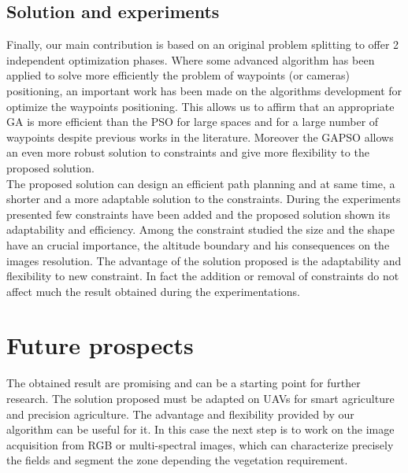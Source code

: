 \subsection{Solution and experiments }
Finally,  our main contribution is based on an original problem splitting to offer 2 independent optimization phases. Where some advanced algorithm has been applied to solve more efficiently the problem of waypoints (or cameras) positioning, an important work has been made on the algorithms development for optimize the waypoints positioning. This allows us to affirm that an appropriate GA is more efficient than the PSO for large spaces and for a large number of waypoints despite previous works in the literature. Moreover the GAPSO allows an even more robust solution to constraints and give more flexibility to the proposed solution. \\
The proposed solution can design an efficient path planning and at same time, a shorter and a more adaptable solution to the constraints. During the experiments presented few constraints have been added and the proposed solution shown its adaptability and efficiency. Among the constraint studied  the size and the shape have an crucial importance, the  altitude boundary and his consequences on the images resolution.
The advantage of the solution proposed is the adaptability and flexibility to new constraint. In fact the addition or removal of constraints do not affect much the result obtained during the experimentations.

\section{Future prospects}
The obtained result are promising and can be a starting point for further research. 
The solution proposed must be adapted on UAVs for smart agriculture and precision agriculture. The advantage and flexibility provided by our algorithm can be useful for it. In this case the next step is to work on the image acquisition from RGB or multi-spectral images, which can characterize precisely the fields and segment the zone depending the vegetation requirement. %

